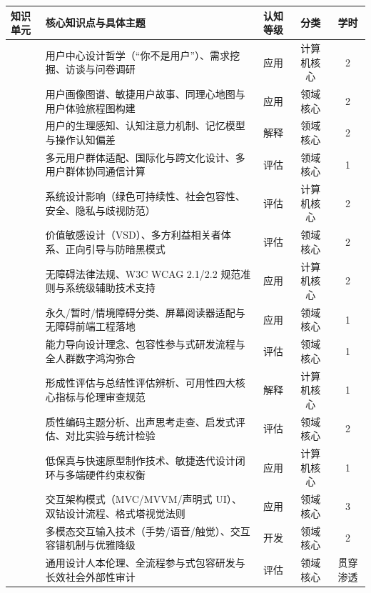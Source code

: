 \noindent\begin{tabularx}{\textwidth}{p{} Y c c c}
\toprule
\textbf{知识单元} & \textbf{核心知识点与具体主题} & \textbf{认知等级} & \textbf{分类} & \textbf{学时} \\
\midrule
{} 
& 用户中心设计哲学（“你不是用户”）、需求挖掘、访谈与问卷调研 & 应用 & 计算机核心 & 2 \\
& 用户画像图谱、敏捷用户故事、同理心地图与用户体验旅程图构建 & 应用 & 领域核心 & 2 \\
& 用户的生理感知、认知注意力机制、记忆模型与操作认知偏差 & 解释 & 领域核心 & 2 \\
& 多元用户群体适配、国际化与跨文化设计、多用户群体协同通信计算 & 评估 & 领域核心 & 1 \\
\midrule
{} 
& 系统设计影响（绿色可持续性、社会包容性、安全、隐私与歧视防范） & 评估 & 计算机核心 & 2 \\
& 价值敏感设计（VSD）、多方利益相关者体系、正向引导与防暗黑模式 & 评估 & 领域核心 & 2 \\
\midrule
{} 
& 无障碍法律法规、W3C WCAG 2.1/2.2 规范准则与系统级辅助技术支持 & 应用 & 计算机核心 & 2 \\
& 永久/暂时/情境障碍分类、屏幕阅读器适配与无障碍前端工程落地 & 应用 & 领域核心 & 1 \\
& 能力导向设计理念、包容性参与式研发流程与全人群数字鸿沟弥合 & 评估 & 领域核心 & 1 \\
\midrule
{} 
& 形成性评估与总结性评估辨析、可用性四大核心指标与伦理审查规范 & 解释 & 计算机核心 & 1 \\
& 质性编码主题分析、出声思考走查、启发式评估、对比实验与统计检验 & 评估 & 领域核心 & 2 \\
\midrule
{} 
& 低保真与快速原型制作技术、敏捷迭代设计闭环与多端硬件约束权衡 & 应用 & 计算机核心 & 1 \\
& 交互架构模式（MVC/MVVM/声明式 UI）、双钻设计流程、格式塔视觉法则 & 应用 & 领域核心 & 3 \\
& 多模态交互输入技术（手势/语音/触觉）、交互容错机制与优雅降级 & 开发 & 领域核心 & 2 \\
\midrule
{} 
& 通用设计人本伦理、全流程参与式包容研发与长效社会外部性审计 & 评估 & 领域核心 & 贯穿渗透 \\
\bottomrule
\end{tabularx}
\clearpage
\twocolumn
